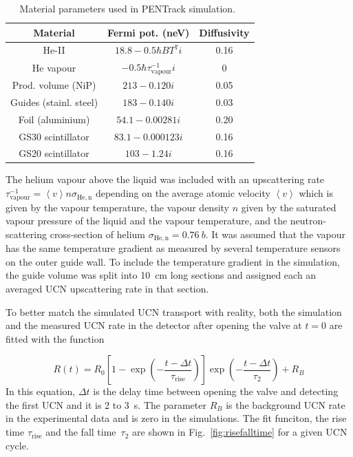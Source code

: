 

\begin{table}
  \centering
\begin{tabular}{|c|c|c|}
  \hline
Material & Fermi pot. (neV) & Diffusivity \\
\hline
  He-II  & $18.8 - 0.5\hbar B T^7 i$ & 0.16 \\
  He vapour & $-0.5 \hbar \tau^{-1}_\mathrm{vapour} i$ & 0 \\
  Prod. volume (NiP) & $213 - 0.120 i$ & 0.05 \\
  Guides (stainl. steel) & $183 - 0.140 i$ & 0.03 \\
  Foil (aluminium) & $54.1 - 0.00281 i$ & 0.20 \\
  GS30 scintillator & $83.1 - 0.000123 i$ & 0.16 \\
  GS20 scintillator & $103 - 1.24 i$ & 0.16 \\
  \hline
\end{tabular}
\caption{Material parameters used in PENTrack
  simulation.~\cite{atchison2009transmission,Ban2016,sears1992neutron}}
\label{tab:materials}
\end{table}

The helium vapour above the liquid was included with an upscattering
rate
$\tau^{-1}_\mathrm{vapour} = \left< v \right> n \sigma_\mathrm{He,n}$
depending on the average atomic velocity $\left < v \right>$ which is
given by the vapour temperature, the vapour density $n$ given by the
saturated vapour pressure of the liquid and the vapour temperature,
and the neutron-scattering cross-section of helium
$\sigma_\mathrm{He,n} = 0.76~b$. It was assumed that the vapour has
the same temperature gradient as measured by several temperature
sensors on the outer guide wall. To include the temperature gradient
in the simulation, the guide volume was split into 10~cm long sections
and assigned each an averaged UCN upscattering rate in that section.

To better match the simulated UCN transport with reality, both the
simulation and the measured UCN rate in the detector after opening the
valve at $t=0$ are fitted with the function

\begin{equation}
R(t) = R_0 \left[ 1 - \exp \left( -\frac{t - \Delta t}{\tau_\mathrm{rise}} \right) \right] \exp \left( -\frac{t - \Delta t}{\tau_2} \right) + R_B
\end{equation}
In this equation, $\Delta t$ is the delay time between opening the
valve and detecting the first UCN and it is 2 to 3~s. The parameter
$ R_B$ is the background UCN rate in the experimental data and is zero
in the simulations.  The fit funciton, the rise time
$\tau_{\mathrm{rise}}$ and the fall time~$\tau_2$ are shown in
Fig.~\ref{fig:risefalltime} for a given UCN cycle.

